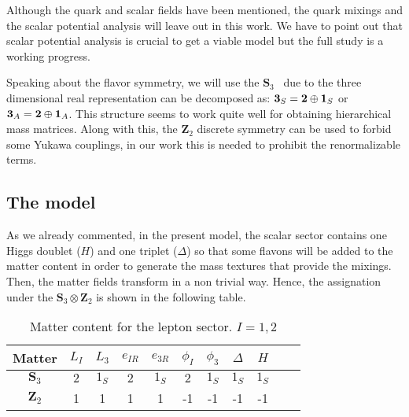 \documentclass[aps,prd,groupaddress,floatfix,tighten,nofootinbib,showpacs,amsfonts,superscriptaddress]{revtex4-2}
\begin{document}
Although the quark and scalar fields have been mentioned, the quark mixings and the scalar potential analysis will leave out in this work. We have to point out that scalar potential analysis is crucial to get a viable model but the full study is a working progress.


Speaking about the flavor symmetry, we will use the $\mathbf{S}_{3}$~\cite{Ishimori:2010au} due to the
three dimensional real representation can be decomposed as: ${\bf 3}_{S}={\bf 2}\oplus {\bf 1}_{S}$ or ${\bf 3}_{A}={\bf 2}\oplus {\bf 1}_{A}$. This structure seems to work quite well for obtaining hierarchical mass matrices. Along with this, the $\mathbf{Z}_{2}$ discrete symmetry can be used to forbid some Yukawa couplings, in our work this is needed to prohibit the renormalizable terms.






\subsection{The model}
As we already commented, in the present model, the scalar sector contains one Higgs doublet ($H$) and one triplet ($\Delta$) so that some flavons
will be added to the matter content in order to generate the mass textures that provide the mixings. Then, the matter fields transform in a non trivial way. Hence, the assignation under the $\mathbf{S}_{3}\otimes \mathbf{Z}_{2}$ is shown in the following table.
\begin{table}[ht]
	\begin{center}
		\begin{tabular}{|c|c|c|c|c|c|c|c|c|c|c|}
			\hline\hline
			{\footnotesize Matter}	& {\footnotesize $L_{I}$} & {\footnotesize $L_{3}$} & {\footnotesize $e_{I R}$}  & {\footnotesize $e_{3 R}$} & {\footnotesize $\phi_{I}$} & {\footnotesize $\phi_{3}$} & {\footnotesize $\Delta$} & {\footnotesize $H$} \\
			\hline
			{\footnotesize $\mathbf{S}_{3}$}	& {\footnotesize \bf $2$} & {\footnotesize \bf $1_{S}$} & {\footnotesize \bf $2$} & {\footnotesize \bf $1_{S}$} & {\footnotesize \bf $2$} & {\footnotesize \bf $1_{S}$} & {\footnotesize \bf $1_{S}$} & {\footnotesize \bf $1_{S}$}\\
			\hline
			{\footnotesize  $\mathbf{Z}_{2}$}	& 1 & 1 & 1 & 1 & -1 & -1 & -1 & -1 \\\hline\hline
		\end{tabular}\caption{Matter content for the lepton sector. $I=1,2$}
	\end{center}
\end{table}
\end{document}
